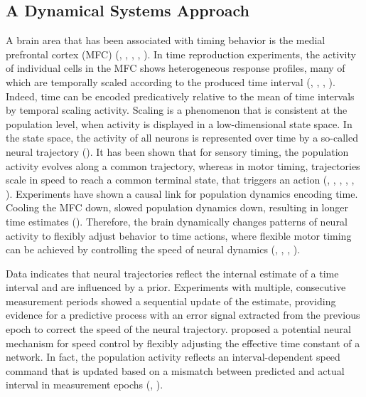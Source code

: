\documentclass[10pt]{article}
\begin{document}
\subsection{A Dynamical Systems Approach}
A brain area that has been associated with timing behavior is the medial prefrontal cortex (MFC)  (\cite{Wang2018}, \cite{Emmons2017}, \cite{Genovesio2006}, \cite{Lewis2004}, \cite{Shima2000}).
In time reproduction experiments, the activity of individual cells in the MFC shows heterogeneous response profiles, many of which are temporally scaled according to the produced time interval (\cite{Henke2021}, \cite{Sohn2019}, \cite{Remington2018}, \cite{Wang2018}).
Indeed, time can be encoded predicatively relative to the mean of time intervals by temporal scaling activity.
Scaling is a phenomenon that is consistent at the population level, when activity is displayed in a low-dimensional state space. In the state space, the activity of all neurons is represented over time by a so-called neural trajectory (\cite{Cueva2022}).
It has been shown that for sensory timing, the population activity evolves along a common trajectory, whereas in motor timing, trajectories scale in speed to reach a common terminal state, that triggers an action (\cite{Henke2021}, \cite{Meirhaeghe2021}, \cite{Sohn2019}, \cite{Wang2018}, \cite{Murakami2014}, \cite{Mita2009}).
Experiments have shown a causal link for population dynamics encoding time. Cooling the MFC down, slowed population dynamics down, resulting in longer time estimates (\cite{Xu2014}). 
Therefore, the brain dynamically changes patterns of neural activity to flexibly adjust behavior to time actions, where flexible motor timing can be achieved by controlling the speed of neural dynamics (\cite{Tsao2022}, \cite{Sohn2019}, \cite{Remington2018}, \cite{Wang2018}).

Data indicates that neural trajectories reflect the internal estimate of a time interval and are influenced by a prior.
Experiments with multiple, consecutive measurement periods showed a sequential update of the estimate, providing evidence for a predictive process with an error signal extracted from the previous epoch to correct the speed of the neural trajectory.
\cite{Wang2018} proposed a potential neural mechanism for speed control by flexibly adjusting the effective time constant of a network.
In fact, the population activity reflects an interval-dependent speed command that is updated based on a mismatch between predicted and actual interval in measurement epochs (\cite{Egger2019}, \cite{Wang2018}). 
\end{document}
